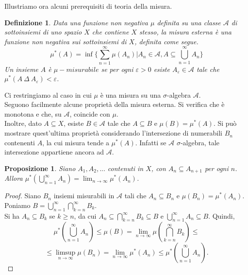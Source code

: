 \documentclass[a4paper, twoside,openright]{article}
\newcommand{\A}{\mathcal{A}}
\newcommand{\<}{\langle}
\renewcommand{\>}{\rangle}
\newtheorem{defin}[teo]{Definizione}
\newtheorem{prop}[teo]{Proposizione}
\begin{document}
	Illustriamo ora alcuni prerequisiti di teoria della misura.
	\begin{defin}
		Data una funzione non negativa $\mu$ definita su una classe $\mathcal{A}$ di sottoinsiemi di uno spazio $X$ che contiene $X$ stesso, la misura esterna è una funzione non negativa sui sottoinsiemi di $X$, definita come segue.
		$$ \mu^*(A) = \inf \bigg\{ \sum_{n=1}^{\infty} \mu (A_n) | A_n \in \mathcal{A}, A \subseteq \bigcup_{n=1}^{\infty} A_n \bigg\} $$
		Un insieme $A$ è $\mu-misurabile$ se per ogni $\varepsilon > 0$ esiste $A_{\varepsilon} \in \mathcal{A}$ tale che $\mu^*(A \ \Delta \ A_{\varepsilon}) < \varepsilon$.
	\end{defin}
	Ci restringiamo al caso in cui $\mu$ è una misura su una $\sigma$-algebra $\mathcal{A}$.\\
	Seguono facilmente alcune proprietà della misura esterna. Si verifica che è monotona e che, su $\A$, coincide con $\mu$.\\
	Inoltre, dato $A \subseteq X$, esiste $B \in \A$ tale che $A \subseteq B$ e $\mu(B)=\mu^*(A)$. Si può mostrare quest'ultima proprietà considerando l'intersezione di numerabili $B_n$ contenenti $A$, la cui misura tende a $\mu^*(A)$. Infatti se $\A$ $\sigma$-algebra, tale intersezione appartiene ancora ad $\A$.
	
	\begin{prop}
		Siano $A_1, A_2, ...$ contenuti in $X$, con $A_{n} \subseteq A_{n+1}$ per ogni $n$. Allora 
		$	\mu^{*}\left(\bigcup_{n=1}^{\infty} A_{n}\right)=\lim _{n \rightarrow \infty} \mu^{*}\left(A_{n}\right)	$.
	\end{prop} 
	\begin{proof}
		Siano $B_{n}$ insiemi misurabili in $\A$ tali che $A_{n} \subseteq B_{n}$ e $\mu\left(B_{n}\right)=\mu^{*}\left(A_{n}\right)$. Poniamo 
		$ B=\bigcup_{n=1}^{\infty} \bigcap_{k=n}^{\infty} B_{k} \text {. }$\\
		Si ha $A_{n} \subseteq B_{k}$ se $k \geq n$, da cui $A_{n} \subseteq \bigcap_{k=n}^\infty B_k \subseteq B$ e $\bigcup_{n=1}^{\infty} A_{n} \subseteq B$. Quindi,	$$ \mu^{*}\left(\textstyle\bigcup_{n=1}^{\infty} A_{n}\right) \leq \mu(B)=\lim _{n \rightarrow \infty} \mu\left(\textstyle\bigcap_{k=n}^{\infty} B_{k}\right) \leq$$ 
		$$\leq \limsup _{n \rightarrow \infty} \mu\left(B_{n}\right)=\lim _{n \rightarrow \infty} \mu^{*}\left(A_{n}\right) \leq \mu^{*}\left(\textstyle\bigcup_{n=1}^{\infty} A_{n}\right).$$
	\end{proof}
\end{document}
